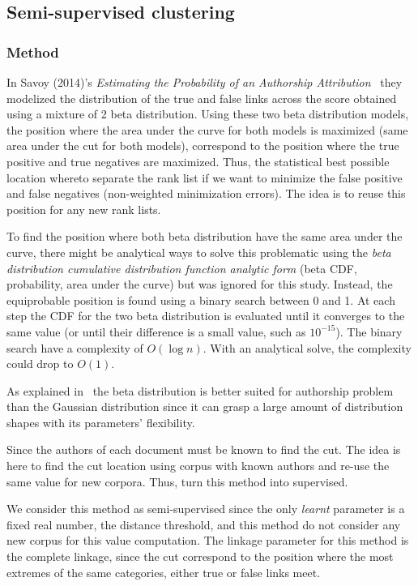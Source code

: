 \subsection{Semi-supervised clustering}

\subsubsection{Method}

In Savoy (2014)'s \textit{Estimating the Probability of an Authorship Attribution}~\cite{savoy_probability} they modelized the distribution of the true and false links across the score obtained using a mixture of 2 beta distribution.
Using these two beta distribution models, the position where the area under the curve for both models is maximized (same area under the cut for both models), correspond to the position where the true positive and true negatives are maximized.
Thus, the statistical best possible location whereto separate the rank list if we want to minimize the false positive and false negatives (non-weighted minimization errors).
The idea is to reuse this position for any new rank lists.

To find the position where both beta distribution have the same area under the curve, there might be analytical ways to solve this problematic using the \textit{beta distribution cumulative distribution function analytic form} (beta CDF, probability, area under the curve) but was ignored for this study.
Instead, the equiprobable position is found using a binary search between 0 and 1.
At each step the CDF for the two beta distribution is evaluated until it converges to the same value (or until their difference is a small value, such as $10^{-15}$).
The binary search have a complexity of $O(\log n)$.
With an analytical solve, the complexity could drop to $O(1)$.

As explained in~\cite{savoy_probability} the beta distribution is better suited for authorship problem than the Gaussian distribution since it can grasp a large amount of distribution shapes with its parameters' flexibility.

Since the authors of each document must be known to find the cut.
The idea is here to find the cut location using corpus with known authors and re-use the same value for new corpora.
Thus, turn this method into supervised.

We consider this method as semi-supervised since the only \textit{learnt} parameter is a fixed real number, the distance threshold, and this method do not consider any new corpus for this value computation.
The linkage parameter for this method is the complete linkage, since the cut correspond to the position where the most extremes of the same categories, either true or false links meet.

